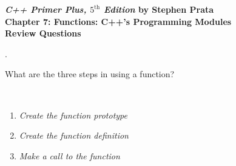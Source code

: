 \documentclass{amsart}
\begin{document}
\begin{center}
	\Large {\bfseries
	\emph{C++ Primer Plus, $5^{\text{th}}$ Edition} by Stephen Prata \\
	Chapter 7: Functions: C++'s Programming Modules \\
	Review Questions} \normalsize \vspace{.5 cm}
\end{center}


\vfill
{}. 
\begin{minipage}[t]{11.5 cm}
	What are the three steps in using a function?
\end{minipage} \\[1ex]
\phantom{3. } 
\begin{minipage}[t]{11.5 cm}
	\begin{enumerate}
		\item {\slshape Create the function prototype} 
		\item {\slshape Create the function definition} 
		\item {\slshape Make a call to the function} 
	\end{enumerate}
\end{minipage} 
\vfill
\end{document}
